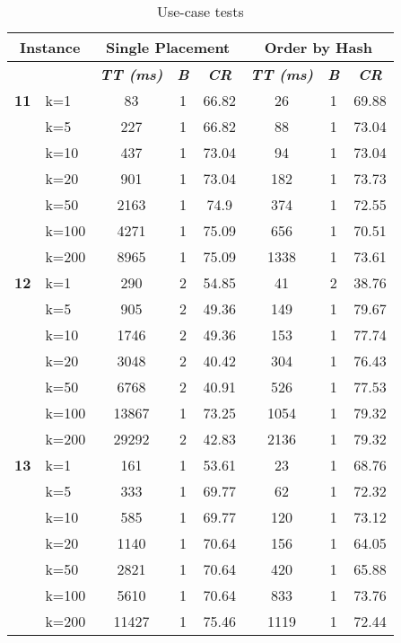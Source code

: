     \begin{table}[htbp]
    \caption{Use-case tests}
    \begin{tabular}{|l|l|c|c|c|c|c|c|}
    
    \multicolumn{ 2}{|c|}{\textbf{Instance}} & \multicolumn{ 3}{c|}{\textbf{Single Placement}} & \multicolumn{ 3}{c|}{\textbf{Order by Hash}} \\ \hline
    \multicolumn{ 2}{|l|}{} & \textbf{\textit{TT (ms)}} & \textbf{\textit{B}} & \textbf{\textit{CR}} & \textbf{\textit{TT (ms)}} & \textbf{\textit{B}} & \textbf{\textit{CR}} \\ \hline
    \multicolumn{1}{|r|}{\textbf{11}} & k=1 & 83 & 1 & 66.82 & 26 & 1 & 69.88 \\ 
     & k=5 & 227 & 1 & 66.82 & 88 & 1 & 73.04 \\ 
     & k=10 & 437 & 1 & 73.04 & 94 & 1 & 73.04 \\ 
     & k=20 & 901 & 1 & 73.04 & 182 & 1 & 73.73 \\ 
     & k=50 & 2163 & 1 & 74.9 & 374 & 1 & 72.55 \\ 
     & k=100 & 4271 & 1 & 75.09 & 656 & 1 & 70.51 \\ 
     & k=200 & 8965 & 1 & 75.09 & 1338 & 1 & 73.61 \\ \hline
    \multicolumn{1}{|r|}{\textbf{12}} & k=1 & 290 & 2 & 54.85 & 41 & 2 & 38.76 \\ 
     & k=5 & 905 & 2 & 49.36 & 149 & 1 & 79.67 \\ 
     & k=10 & 1746 & 2 & 49.36 & 153 & 1 & 77.74 \\ 
     & k=20 & 3048 & 2 & 40.42 & 304 & 1 & 76.43 \\ 
     & k=50 & 6768 & 2 & 40.91 & 526 & 1 & 77.53 \\ 
     & k=100 & 13867 & 1 & 73.25 & 1054 & 1 & 79.32 \\ 
     & k=200 & 29292 & 2 & 42.83 & 2136 & 1 & 79.32 \\ \hline
    \multicolumn{1}{|r|}{\textbf{13}} & k=1 & 161 & 1 & 53.61 & 23 & 1 & 68.76 \\ 
     & k=5 & 333 & 1 & 69.77 & 62 & 1 & 72.32 \\ 
     & k=10 & 585 & 1 & 69.77 & 120 & 1 & 73.12 \\ 
     & k=20 & 1140 & 1 & 70.64 & 156 & 1 & 64.05 \\ 
     & k=50 & 2821 & 1 & 70.64 & 420 & 1 & 65.88 \\ 
     & k=100 & 5610 & 1 & 70.64 & 833 & 1 & 73.76 \\ 
     & k=200 & 11427 & 1 & 75.46 & 1119 & 1 & 72.44 \\ \hline

\end{tabular}
\end{table}
